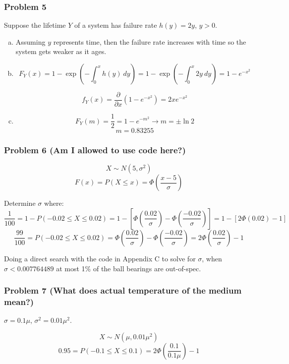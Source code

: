 \documentclass[11pt]{extarticle}
\begin{document}
\subsubsection*{Problem 5}

Suppose the lifetime $Y$ of a system has failure rate $h(y) = 2y$, $y>0$.

\begin{enumerate}[(a)]
\item Assuming $y$ represents time, then the failure rate increases with time so the system gets weaker as it ages.
\item $$F_Y(x) = 1 - \exp \left( -\int_0^x h(y)\ dy \right) = 1 - \exp \left( -\int_0^x 2y\ dy \right) = \boxed{ 1 - e^{-x^2} }$$

$$ f_Y(x) = \frac{\partial}{\partial x} \left( 1 -e^{-x^2} \right) = \boxed{ 2x e^{-x^2} } $$

\item $$F_Y(m) = \frac{1}{2}  = 1 - e^{-m^2} \rightarrow m = \pm \ln{2}$$ $$ \boxed{m=0.83255} $$

\end{enumerate}

\subsubsection*{Problem 6 (Am I allowed to use code here?)}

$$ X \sim N(5, \sigma^2 )$$
$$F(x) = P(X \leq x) =  \Phi \left( \frac{x - 5}{\sigma} \right)$$

Determine $\sigma$ where:  $$ \frac{1}{100} = 1 - P(-0.02 \leq X \leq 0.02) = 1 - \left[ \Phi \left(\frac{0.02}{\sigma} \right) - \Phi \left( \frac{-0.02}{\sigma} \right) \right] = 1 - \left[ 2 \Phi(0.02)-1 \right] $$ 
 $$ \frac{99}{100} = P(-0.02 \leq X \leq 0.02) =  \Phi \left(\frac{0.02}{\sigma} \right) - \Phi \left( \frac{-0.02}{\sigma} \right)  = 2 \Phi \left( \frac{0.02}{\sigma} \right) -1  $$ 

Doing a direct search with the code in Appendix C to solve for $\sigma$, when $\boxed{\sigma < 0.007764489}$ at most 1\% of the ball bearings are out-of-spec.

\subsubsection*{Problem 7 (What does actual temperature of the medium mean?)}

$\sigma=0.1\mu$, $\sigma^2 =  0.01\mu^2$.

$$ X \sim N(\mu, 0.01\mu^2 ) $$ 
$$ 0.95 = P(-0.1 \leq X \leq 0.1) = 2\Phi \left( \frac{0.1}{0.1\mu} \right)-1 $$
\end{document}
